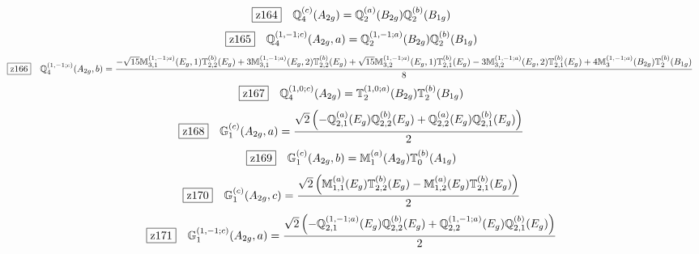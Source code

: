 \documentclass[fleqn,10pt,landscape]{jsarticle}
\begin{document}
\begin{dmath*}
\hspace*{3mm}\fbox{z164}\quad \mathbb{Q}_{4}^{(c)}(A_{2g})=\mathbb{Q}_{2}^{(a)}(B_{2g}) \mathbb{Q}_{2}^{(b)}(B_{1g})
\end{dmath*}
\begin{dmath*}
\hspace*{3mm}\fbox{z165}\quad \mathbb{Q}_{4}^{(1,-1;c)}(A_{2g},a)=\mathbb{Q}_{2}^{(1,-1;a)}(B_{2g}) \mathbb{Q}_{2}^{(b)}(B_{1g})
\end{dmath*}
\begin{dmath*}
\hspace*{3mm}\fbox{z166}\quad \mathbb{Q}_{4}^{(1,-1;c)}(A_{2g},b)=\frac{- \sqrt{15} \mathbb{M}_{3,1}^{(1,-1;a)}(E_{g},1) \mathbb{T}_{2,2}^{(b)}(E_{g}) + 3 \mathbb{M}_{3,1}^{(1,-1;a)}(E_{g},2) \mathbb{T}_{2,2}^{(b)}(E_{g}) + \sqrt{15} \mathbb{M}_{3,2}^{(1,-1;a)}(E_{g},1) \mathbb{T}_{2,1}^{(b)}(E_{g}) - 3 \mathbb{M}_{3,2}^{(1,-1;a)}(E_{g},2) \mathbb{T}_{2,1}^{(b)}(E_{g}) + 4 \mathbb{M}_{3}^{(1,-1;a)}(B_{2g}) \mathbb{T}_{2}^{(b)}(B_{1g})}{8}
\end{dmath*}
\begin{dmath*}
\hspace*{3mm}\fbox{z167}\quad \mathbb{Q}_{4}^{(1,0;c)}(A_{2g})=\mathbb{T}_{2}^{(1,0;a)}(B_{2g}) \mathbb{T}_{2}^{(b)}(B_{1g})
\end{dmath*}
\begin{dmath*}
\hspace*{3mm}\fbox{z168}\quad \mathbb{G}_{1}^{(c)}(A_{2g},a)=\frac{\sqrt{2} \left(- \mathbb{Q}_{2,1}^{(a)}(E_{g}) \mathbb{Q}_{2,2}^{(b)}(E_{g}) + \mathbb{Q}_{2,2}^{(a)}(E_{g}) \mathbb{Q}_{2,1}^{(b)}(E_{g})\right)}{2}
\end{dmath*}
\begin{dmath*}
\hspace*{3mm}\fbox{z169}\quad \mathbb{G}_{1}^{(c)}(A_{2g},b)=\mathbb{M}_{1}^{(a)}(A_{2g}) \mathbb{T}_{0}^{(b)}(A_{1g})
\end{dmath*}
\begin{dmath*}
\hspace*{3mm}\fbox{z170}\quad \mathbb{G}_{1}^{(c)}(A_{2g},c)=\frac{\sqrt{2} \left(\mathbb{M}_{1,1}^{(a)}(E_{g}) \mathbb{T}_{2,2}^{(b)}(E_{g}) - \mathbb{M}_{1,2}^{(a)}(E_{g}) \mathbb{T}_{2,1}^{(b)}(E_{g})\right)}{2}
\end{dmath*}
\begin{dmath*}
\hspace*{3mm}\fbox{z171}\quad \mathbb{G}_{1}^{(1,-1;c)}(A_{2g},a)=\frac{\sqrt{2} \left(- \mathbb{Q}_{2,1}^{(1,-1;a)}(E_{g}) \mathbb{Q}_{2,2}^{(b)}(E_{g}) + \mathbb{Q}_{2,2}^{(1,-1;a)}(E_{g}) \mathbb{Q}_{2,1}^{(b)}(E_{g})\right)}{2}
\end{dmath*}
\end{document}
